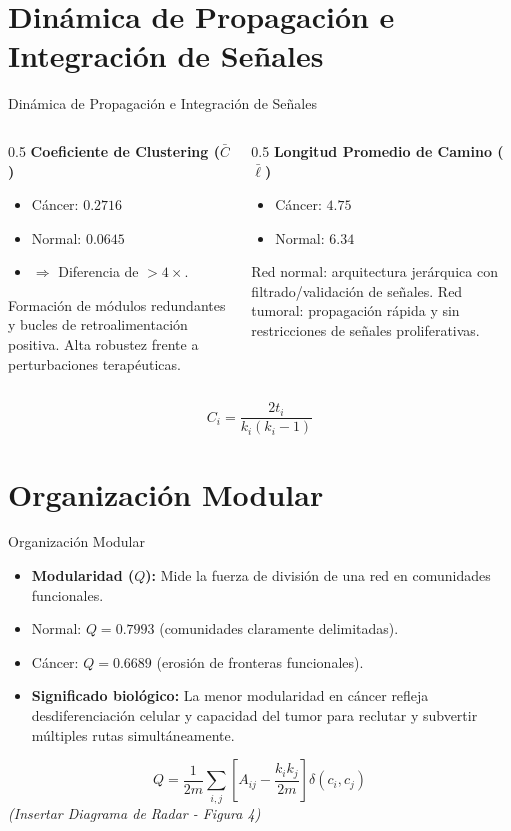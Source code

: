 \documentclass[12pt]{beamer}
\begin{document}
	\section{Dinámica de Propagación e Integración de Señales}
	\begin{frame}{Dinámica de Propagación e Integración de Señales}
		\begin{columns}
			\begin{column}{0.5\textwidth}
				\textbf{Coeficiente de Clustering ($\bar{C}$)}
				\begin{itemize}
					\item Cáncer: $0.2716$
					\item Normal: $0.0645$
					\item $\Rightarrow$ Diferencia de $>4\times$.
				\end{itemize}
				\small{Formación de módulos redundantes y bucles de retroalimentación positiva. Alta robustez frente a perturbaciones terapéuticas.}
			\end{column}
			\begin{column}{0.5\textwidth}
				\textbf{Longitud Promedio de Camino ($\bar{\ell}$)}
				\begin{itemize}
					\item Cáncer: $4.75$
					\item Normal: $6.34$
				\end{itemize}
				\small{Red normal: arquitectura jerárquica con filtrado/validación de señales. Red tumoral: propagación rápida y sin restricciones de señales proliferativas.}
			\end{column}
		\end{columns}
		\begin{equation*}
			C_i = \frac{2t_i}{k_i(k_i-1)}
		\end{equation*}
	\end{frame}
	
	\section{Organización Modular}
	\begin{frame}{Organización Modular}
		\begin{itemize}
			\item \textbf{Modularidad ($Q$):} Mide la fuerza de división de una red en comunidades funcionales.
			\item Normal: $Q = 0.7993$ (comunidades claramente delimitadas).
			\item Cáncer: $Q = 0.6689$ (erosión de fronteras funcionales).
			\item \textbf{Significado biológico:} La menor modularidad en cáncer refleja desdiferenciación celular y capacidad del tumor para reclutar y subvertir múltiples rutas simultáneamente.
		\end{itemize}
		\begin{equation*}
			Q = \frac{1}{2m} \sum_{i,j} \left[ A_{ij} - \frac{k_i k_j}{2m} \right] \delta(c_i, c_j)
		\end{equation*}
		\vspace{0.2cm}
		\centering \footnotesize \textit{(Insertar Diagrama de Radar - Figura 4)}
	\end{frame}
	
\end{document}

